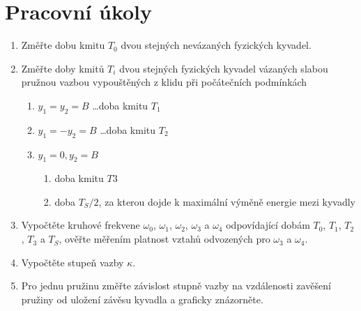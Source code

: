 \documentclass[a4paper]{article}
\author{Vladislav Wohlrath}
\begin{document}
\begin{titlepage}

\end{titlepage}

\section*{Pracovní úkoly}
\begin{enumerate}
\item Změřte dobu kmitu $T_0$ dvou stejných nevázaných fyzických kyvadel.
\item Změřte doby kmitů $T_i$ dvou stejných fyzických kyvadel vázaných slabou pružnou vazbou vypouštěných z klidu při počátečních podmínkách
\begin{enumerate}
\item $y_1=y_2=B$ \ldots doba kmitu $T_1$
\item $y_1=-y_2=B$ \ldots doba kmitu $T_2$
\item $y_1=0, y_2=B$
	\begin{enumerate}
	\item doba kmitu $T3$
	\item doba $T_S/2$, za kterou dojde k maximální výměně energie mezi kyvadly
	\end{enumerate}
\end{enumerate}
\item Vypočtěte kruhové frekvene $\omega _0$, $\omega _1$, $\omega _2$, $\omega _3$ a $\omega _4$ odpovídající dobám $T_0$, $T_1$, $T_2$, $T_3$ a $T_S$, ověřte měřením platnost vztahů odvozených pro $\omega _3$ a $\omega _4$.
\item Vypočtěte stupeň vazby $\kappa$.
\item Pro jednu pružinu změřte závislost stupně vazby na vzdálenosti zavěšení pružiny od uložení závěsu kyvadla a graficky znázorněte.
\end{enumerate}












\printbibliography[title={Seznam použité literatury}]
\end{document}
